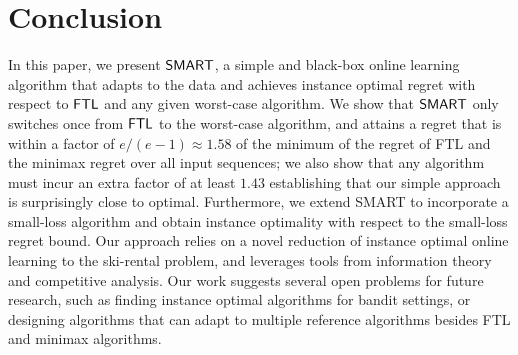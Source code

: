 \section{Conclusion} \label{sec:conclusion}

In this paper, we present $\mathsf{SMART}$, a simple and black-box online learning algorithm that adapts to the data and achieves instance optimal regret with respect to $\mathsf{FTL}$ and any given worst-case algorithm. We show that $\mathsf{SMART}$ only switches once from $\mathsf{FTL}$ to the worst-case algorithm, and attains a regret that is within a factor of $e/(e-1) \approx 1.58$ of the minimum of the regret of FTL and the minimax regret over all input sequences; we also show that any algorithm must incur an extra factor of at least $1.43$ establishing that our simple approach is surprisingly close to optimal. Furthermore, we extend SMART to incorporate a small-loss algorithm and obtain instance optimality with respect to the small-loss regret bound. Our approach relies on a novel reduction of instance optimal online learning to the ski-rental problem, and leverages tools from information theory and competitive analysis. Our work suggests several open problems for future research, such as finding instance optimal algorithms for bandit settings, or designing algorithms that can adapt to multiple reference algorithms besides FTL and minimax algorithms.